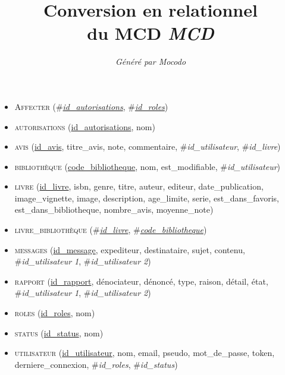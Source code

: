 \documentclass[a4paper]{article}
\title{Conversion en relationnel\\du MCD \emph{MCD}}
\author{\emph{Généré par Mocodo}}
\newcommand{\relat}[1]{\textsc{#1}}
\newcommand{\attr}[1]{#1}
\newcommand{\prim}[1]{\uline{#1}}
\newcommand{\foreign}[1]{\#\textsl{#1}}
\begin{document}
\maketitle

\begin{itemize}
  \item \relat{Affecter} (\foreign{\prim{id\_autorisations}}, \foreign{\prim{id\_roles}})
  \item \relat{autorisations} (\prim{id\_autorisations}, \attr{nom})
  \item \relat{avis} (\prim{id\_avis}, \attr{titre\_avis}, \attr{note}, \attr{commentaire}, \foreign{id\_utilisateur}, \foreign{id\_livre})
  \item \relat{bibliothèque} (\prim{code\_bibliotheque}, \attr{nom}, \attr{est\_modifiable}, \foreign{id\_utilisateur})
  \item \relat{livre} (\prim{id\_livre}, \attr{isbn}, \attr{genre}, \attr{titre}, \attr{auteur}, \attr{editeur}, \attr{date\_publication}, \attr{image\_vignette}, \attr{image}, \attr{description}, \attr{age\_limite}, \attr{serie}, \attr{est\_dans\_favoris}, \attr{est\_dans\_bibliotheque}, \attr{nombre\_avis}, \attr{moyenne\_note})
  \item \relat{livre\_bibliothèque} (\foreign{\prim{id\_livre}}, \foreign{\prim{code\_bibliotheque}})
  \item \relat{messages} (\prim{id\_message}, \attr{expediteur}, \attr{destinataire}, \attr{sujet}, \attr{contenu}, \foreign{id\_utilisateur 1}, \foreign{id\_utilisateur 2})
  \item \relat{rapport} (\prim{id\_rapport}, \attr{dénociateur}, \attr{dénoncé}, \attr{type}, \attr{raison}, \attr{détail}, \attr{état}, \foreign{id\_utilisateur 1}, \foreign{id\_utilisateur 2})
  \item \relat{roles} (\prim{id\_roles}, \attr{nom})
  \item \relat{status} (\prim{id\_status}, \attr{nom})
  \item \relat{utilisateur} (\prim{id\_utilisateur}, \attr{nom}, \attr{email}, \attr{pseudo}, \attr{mot\_de\_passe}, \attr{token}, \attr{derniere\_connexion}, \foreign{id\_roles}, \foreign{id\_status})
\end{itemize}
\end{document}
